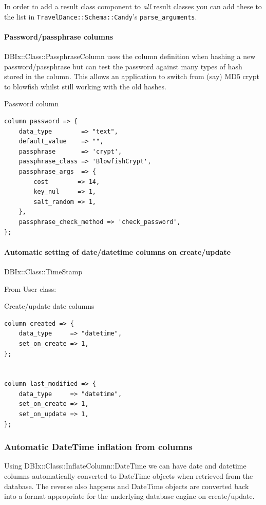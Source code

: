 In order to add a result class component to \emph{all} result classes you
can add these to the list 
in \verb|TravelDance::Schema::Candy|'s \verb|parse_arguments|.

\paragraph{Password/passphrase columns}

DBIx::Class::PassphraseColumn uses the column definition when hashing a new
password/passphrase but can test the password against many types of hash
stored in the column. This allows an application to switch from (say)
MD5 crypt to blowfish whilst still working with the old hashes.

\begin{frame}[fragile]{Password column}
\begin{lstlisting}
column password => {
    data_type        => "text",
    default_value    => "",
    passphrase       => 'crypt',
    passphrase_class => 'BlowfishCrypt',
    passphrase_args  => {
        cost        => 14,
        key_nul     => 1,
        salt_random => 1,
    },
    passphrase_check_method => 'check_password',
};
\end{lstlisting}
\end{frame}

\paragraph{Automatic setting of date/datetime columns on create/update}
DBIx::Class::TimeStamp

From User class:

\begin{frame}[fragile]{Create/update date columns}
\begin{lstlisting}
column created => {
    data_type     => "datetime",
    set_on_create => 1,
};


column last_modified => {
    data_type     => "datetime",
    set_on_create => 1,
    set_on_update => 1,
};
\end{lstlisting}
\end{frame}

\subsubsection{Automatic DateTime inflation from columns}

Using DBIx::Class::InflateColumn::DateTime we can have date and datetime
columns automatically converted to DateTime objects when retrieved from the
database. The reverse also happens and DateTime objects are converted back
into a format appropriate for the underlying database engine on
create/update.

